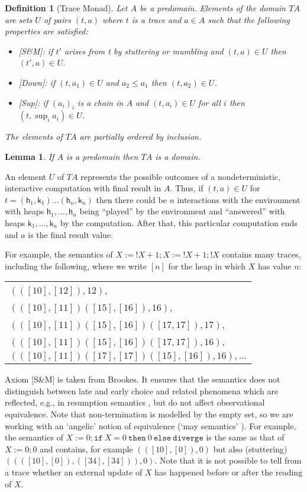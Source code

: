 \documentclass[nocopyrightspace,preprint]{sigplanconf}
\newcommand{\keywd}[1]{\mathtt{#1}}
\newcommand{\myread}[1]{!{#1}}
\newcommand{\mequals}{\keywd{=}}
\newcommand{\assign}[2]{{#1}:={#2}}
\newcommand{\myif}[3]{\keywd{if}\ #1\ \keywd{then}\ #2\
  \keywd{else}\ #3}
\newtheorem{lemma}[theorem]{Lemma}
\newtheorem{definition}[theorem]{Definition}
\newcommand{\cloc}{\ensuremath{X}\xspace}
\newcommand\heap{\ensuremath{\mathsf{h}}\xspace}
\newcommand\h{\heap}
\renewcommand\k{\ensuremath{\mathsf{k}}\xspace}
\newcommand{\tup}[1]{(#1)}
\begin{document}
\begin{definition}[Trace Monad]
\label{def:monad}
Let $A$ be a predomain. Elements of the domain $TA$ 
  are sets $U$ of pairs $\tup{t,a}$ where $t$ is a
 trace and $a\in A$ such that the following properties are satisfied:
\begin{itemize}
\item \textit{[S\&M]}: if $t'$ arises from t by stuttering or mumbling and
 $\tup{t,a}\in U$ then $\tup{t',a} \in U$. 
\item \textit{[Down]}: if $\tup{t,a_1}\in U$ and $a_2\leq a_1$ then
  $\tup{t,a_2}\in U$.
\item \textit{[Sup]}: if $(a_i)_i$ is a chain in $A$ and $\tup{t,a_i}\in U$ for all $i$ then  $\tup{t,\sup_i a_i}\in U$. 
\end{itemize}
The elements of $TA$ are partially ordered by inclusion.  
\end{definition}
\begin{lemma}
If $A$ is a predomain then $TA$ is a domain. 
\end{lemma}
An element $U$ of $TA$ represents the possible outcomes of a
nondeterministic, interactive computation with final result in
$A$. Thus, if $\tup{t,a}\in U$ for $t=(\h_1,\k_1)\dots(\h_n,\k_n)$
then there could be $n$ interactions with the
environment with heaps $\h_1,\dots,\h_n$ being ``played'' by the
environment and ``answered'' with heaps $\k_1,\dots,\k_n$ by the
computation. After that, this particular computation ends and $a$ is
the final result value.

For example, the semantics of 
$\cloc:=\myread{\cloc}+1;\cloc:=\myread{\cloc}+1;\myread{X}$ 
contains many traces, including the following, where we write $[n]$ for
the heap in which $\cloc$ has value $n$:

\begin{tabular}{l}
$\tup{([10],[12]),12}$, \\
$\tup{([10],[11])([15],[16]),16}$,\\
$\tup{([10],[11])([15],[16])([17,17]),17}$,\\
$\tup{([10],[11])([15],[16])([17,17]),16}$,\\
$\tup{([10],[11])([17],[17])([15],[16]),16},\ldots$
\end{tabular}

Axiom [S\&M] is taken from Brookes. It ensures that the semantics does
not distinguish between late and early choice \cite{dreyer} and
related phenomena which are reflected, e.g., in resumption semantics
\cite{plotkin76siam}, but do not affect observational equivalence.
Note that non-termination is modelled by the empty set, so we are
working with an `angelic' notion of equivalence
(`may semantics'
\cite{DBLP:dblp_conf/icalp/NicolaH83}). For example, the semantics of
 $\assign{X}{0};\myif{X\mequals 0}{0}{\keywd{diverge}}$
is the same as that of $\assign{X}{0};0$ and contains, for example
$\tup{([10],[0]),0}$ but also (stuttering)
$\tup{(([10],[0]),([34],[34])),0}$.  Note that it is not possible to
tell from a trace whether an external update of $\cloc$ has happened
before or after the reading of $\cloc$.
\end{document}
